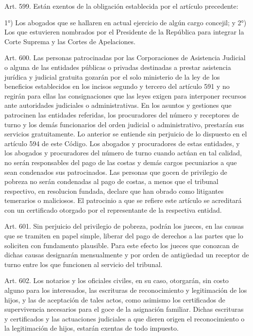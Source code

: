     Art. 599. Están exentos de la obligación establecida por el artículo precedente:

    1°) Los abogados que se hallaren en actual ejercicio de algún cargo concejil; y
    2°) Los que estuvieren nombrados por el Presidente de la República para integrar la Corte Suprema y las Cortes de Apelaciones.

    Art. 600. Las personas patrocinadas por las Corporaciones de Asistencia Judicial o alguna de las entidades públicas o privadas destinadas a prestar asistencia jurídica y judicial gratuita gozarán por el solo ministerio de la ley de los beneficios establecidos en los incisos segundo y tercero del artículo 591 y no regirán para ellas las consignaciones que las leyes exigen para interponer recursos ante autoridades judiciales o administrativas. En los asuntos y gestiones que patrocinen las entidades referidas, los procuradores del número y receptores de turno y los demás funcionarios del orden judicial o administrativo, prestarán sus servicios gratuitamente. Lo anterior se entiende sin perjuicio de lo dispuesto en el artículo 594 de este Código.
    Los abogados y procuradores de estas entidades, y los abogados y procuradores del número de turno cuando actúan en tal calidad, no serán responsables del pago de las costas y demás cargos pecuniarios a que sean condenados sus patrocinados.
    Las personas que gocen de privilegio de pobreza no serán condenadas al pago de costas, a menos que el tribunal respectivo, en resolucion fundada, declare que han obrado como litigantes temerarios o maliciosos.
    El patrocinio a que se refiere este artículo se acreditará con un certificado otorgado por el representante de la respectiva entidad.



    Art. 601. Sin perjuicio del privilegio de pobreza, podrán los jueces, en las causas que se tramiten en papel simple, liberar del pago de derechos a las partes que lo soliciten con fundamento plausible. Para este efecto los jueces que conozcan de dichas causas designarán mensualmente y por orden de antigüedad un receptor de turno entre los que funcionen al servicio del tribunal.

    Art. 602. Los notarios y los oficiales civiles, en su caso, otorgarán, sin costo alguno para los interesados, las escrituras de reconocimiento y legitimación de los hijos, y las de aceptación de tales actos, como asimismo los certificados de supervivencia necesarios para el goce de la asignación familiar.
    Dichas escrituras y certificados y las actuaciones judiciales a que dieren origen el reconocimiento o la legitimación de hijos, estarán exentas de todo impuesto.

